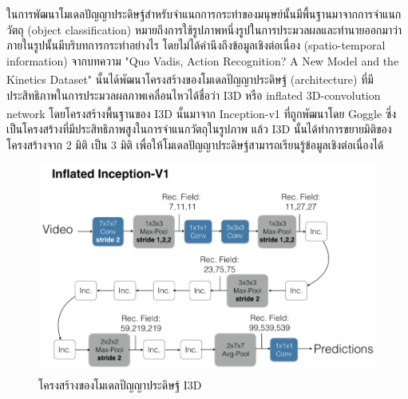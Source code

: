 ในการพัฒนาโมเดลปัญญาประดิษฐ์สำหรับจำแนกการกระทำของมนุษย์นั้นมีพื้นฐานมาจากการจำแนกวัตถุ (object classification)
หมายถึงการใช้รูปภาพหนึ่งรูปในการประมวลผลและทำนายออกมาว่าภายในรูปนั้นมีบริบทการกระทำอย่างไร โดยไม่ได้คำนึงถึงข้อมูลเชิงต่อเนื่อง (spatio-temporal information)
จากบทความ "Quo Vadis, Action Recognition? A New Model and the Kinetics Dataset"\textsuperscript{\cite{I3D}} นั้นได้พัฒนาโครงสร้างของโมเดลปัญญาประดิษฐ์ (architecture) 
ที่มีประสิทธิภาพในการประมวลผลภาพเคลื่อนไหวได้ชื่อว่า I3D หรือ inflated 3D-convolution network
โดยโครงสร้างพื้นฐานของ I3D นั้นมาจาก Inception-v1\textsuperscript{\cite{Inception}} ที่ถูกพัฒนาโดย Goggle ซึ่งเป็นโครงสร้างที่มีประสิทธิภาพสูงในการจำแนกวัตถุในรูปภาพ
แล้ว I3D นั้นได้ทำการขยายมิติของโครงสร้างจาก 2 มิติ เป็น 3 มิติ เพื่อให้โมเดลปัญญาประดิษฐ์สามารถเรียนรู้ข้อมูลเชิงต่อเนื่องได้
\begin{figure}[!ht]
    \centering
    \includegraphics[width=1.0\textwidth]{chapter2/images/I3D.png}
    \caption{โครงสร้างของโมเดลปัญญาประดิษฐ์ I3D\textsuperscript{\cite{I3D}}}
    \label{fig:I3DArch}
\end{figure}

